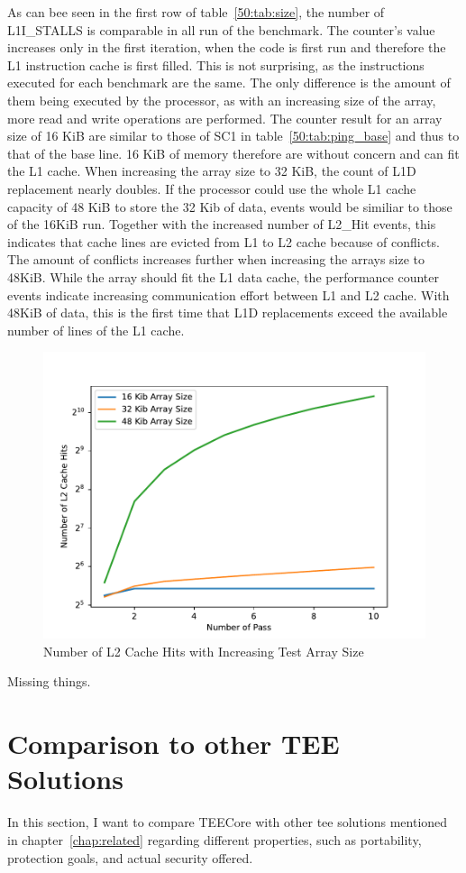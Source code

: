 As can bee seen in the first row of table~\ref{50:tab:size}, the number of
L1I\_STALLS is comparable in all run of the benchmark. The counter's value
increases only in the first iteration, when the code is first run and therefore
the L1 instruction cache is first filled. This is not surprising, as the
instructions executed for each benchmark are the same. The only difference is
the amount of them being executed by the processor, as with an increasing size
of the array, more read and write operations are performed. The counter result
for an array size of 16 KiB are similar to those of SC1 in
table~\ref{50:tab:ping_base} and thus to that of the base line. 16 KiB of memory
therefore are without concern and can fit the L1 cache. When increasing the
array size to 32 KiB, the count of L1D replacement nearly doubles. If the
processor could use the whole L1 cache capacity of 48 KiB to store the 32 Kib of
data, events would be similiar to those of the 16KiB run. Together with the
increased number of L2\_Hit events, this indicates that cache lines are evicted
from L1 to L2 cache because of conflicts. The amount of conflicts increases
further when increasing the arrays size to 48KiB. While the array should fit the
L1 data cache, the performance counter events indicate increasing communication
effort between L1 and L2 cache. With 48KiB of data, this is the first time that
L1D replacements exceed the available number of lines of the L1 cache.

\begin{figure}
    \centering
    \includegraphics[width=.7\textwidth]{images/plots/l2-hits.pdf}
    \caption{Number of L2 Cache Hits with Increasing Test Array Size}
    \label{fig:eval:l2_hits}
\end{figure}

Missing things. 

\section{Comparison to other TEE Solutions}
\label{eval:compare}
In this section, I want to compare TEECore with other \gls{tee} solutions
mentioned in chapter~\ref{chap:related} regarding different properties, such as
portability, protection goals, and actual security offered.

